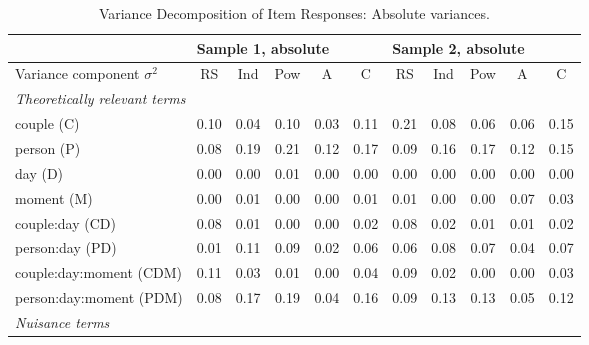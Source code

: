 \documentclass[jou,a4paper,draftfirst]{apa6}\usepackage[]{graphicx}\usepackage[]{color}
\begin{document}
\begin{table*}
	\begin{threeparttable}
		\footnotesize
		\caption{Variance Decomposition of Item Responses: Absolute variances.}
		\label{tab:varDecompAbs}
		\begin{tabular}{lcccccccccc}
			\toprule			
			
 			 & \multicolumn{5}{l}{Sample 1, absolute} & \multicolumn{5}{l}{Sample 2, absolute} \\ 
			
			
			\midrule	
					   
 			Variance component $\sigma^2$ & RS & Ind & Pow & A & C & RS & Ind & Pow & A & C\\ 
			
			\midrule			   

 			\multicolumn{6}{l}{\emph{Theoretically relevant terms}} &&&&&\\ 
 
 couple (C) & 0.10 & 0.04 & 0.10 & 0.03 & 0.11 & 0.21 & 0.08 & 0.06 & 0.06 & 0.15 \\ 
  person (P) & 0.08 & 0.19 & 0.21 & 0.12 & 0.17 & 0.09 & 0.16 & 0.17 & 0.12 & 0.15 \\ 
  day (D) & 0.00 & 0.00 & 0.01 & 0.00 & 0.00 & 0.00 & 0.00 & 0.00 & 0.00 & 0.00 \\ 
  moment (M) & 0.00 & 0.01 & 0.00 & 0.00 & 0.01 & 0.01 & 0.00 & 0.00 & 0.07 & 0.03 \\ 
  couple:day (CD) & 0.08 & 0.01 & 0.00 & 0.00 & 0.02 & 0.08 & 0.02 & 0.01 & 0.01 & 0.02 \\ 
  person:day (PD) & 0.01 & 0.11 & 0.09 & 0.02 & 0.06 & 0.06 & 0.08 & 0.07 & 0.04 & 0.07 \\ 
  couple:day:moment (CDM) & 0.11 & 0.03 & 0.01 & 0.00 & 0.04 & 0.09 & 0.02 & 0.00 & 0.00 & 0.03 \\ 
  person:day:moment (PDM) & 0.08 & 0.17 & 0.19 & 0.04 & 0.16 & 0.09 & 0.13 & 0.13 & 0.05 & 0.12 \\ 
  

\midrule	

  \multicolumn{6}{l}{\emph{Nuisance terms}} &&&&&\\ 
 

\end{tabular}
\end{threeparttable}
\end{table*}
\end{document}
